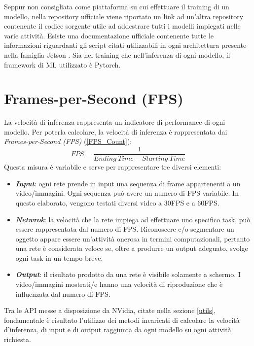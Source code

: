 Seppur non consigliata come piattaforma su cui effettuare il 
training di un modello, nella repository ufficiale \cite{repo_jetson_nano} viene riportato un link ad 
un'altra repository \cite{repo_pytorch_training} contenente il codice sorgente utile ad addestrare tutti 
i modelli impiegati nelle varie attività. Esiste una documentazione ufficiale 
contenente tutte le informazioni riguardanti gli script citati utilizzabili in 
ogni architettura presente nella famiglia Jetson \cite{Documentation_jetson}. Sia nel training che 
nell'inferenza di ogni modello, il framework di ML utilizzato è Pytorch.


\section{Frames-per-Second (FPS)}
La velocità di inferenza rappresenta un indicatore di performance di ogni 
modello. Per poterla calcolare, la velocità di inferenza è rappresentata dai 
\emph{Frames-per-Second (FPS)} (\ref{FPS_Count}):
\begin{equation}\label{FPS_Count}
    FPS = \frac{1}{Ending \ Time - Starting \ Time}
\end{equation}
Questa misura è variabile e serve per rappresentare tre diversi elementi:
\begin{itemize}
    \item {\bfseries{\emph{Input}}}: ogni rete prende in input una sequenza di frame appartenenti 
    a un video/immagini. Ogni sequenza può avere un numero di FPS variabile. In 
    questo elaborato, vengono testati diversi video a 30FPS e a 60FPS.
    \item {\bfseries{\emph{Netwrok}}}: la velocità che la rete impiega ad effettuare uno specifico 
    task, può essere rappresentata dal numero di FPS. Riconoscere e/o 
    segmentare un oggetto appare essere un'attività onerosa in termini 
    computazionali, pertanto una rete è considerata veloce se, oltre a 
    produrre un output adeguato, svolge ogni task in un tempo breve.
    \item {\bfseries{\emph{Output}}}: il risultato prodotto da una rete è visibile solamente a 
    schermo. I video/immagini mostrati/e hanno una velocità di riproduzione 
    che è influenzata dal numero di FPS.
\end{itemize}
Tra le API messe a disposizione da NVidia, citate nella sezione \ref{utils}, 
fondamentale è risultato l'utilizzo dei metodi incaricati di calcolare la 
velocità d'inferenza, di input e di output raggiunta da ogni modello su ogni 
attività richiesta. 